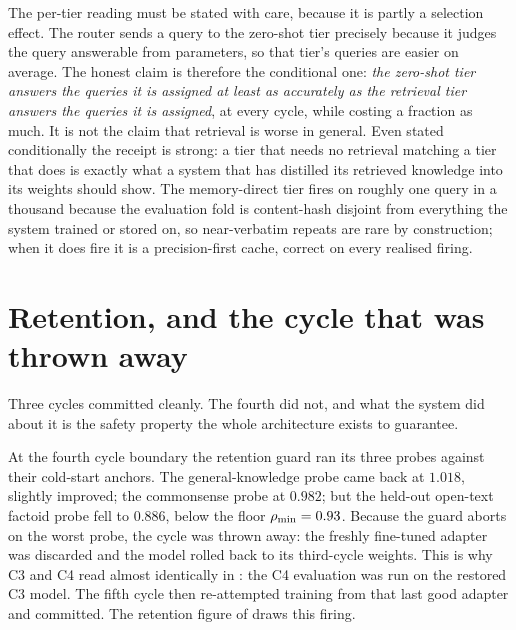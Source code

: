 \begin{bythenumbers}
The per-tier reading must be stated with care, because it is partly a selection effect.
The router sends a query to the zero-shot tier precisely because it judges the query
answerable from parameters, so that tier's queries are easier on average. The honest
claim is therefore the conditional one: \emph{the zero-shot tier answers the queries it
is assigned at least as accurately as the retrieval tier answers the queries it is
assigned}, at every cycle, while costing a fraction as much. It is not the claim that
retrieval is worse in general. Even stated conditionally the receipt is strong: a tier
that needs no retrieval matching a tier that does is exactly what a system that has
distilled its retrieved knowledge into its weights should show. The memory-direct tier
fires on roughly one query in a thousand because the evaluation fold is content-hash
disjoint from everything the system trained or stored on, so near-verbatim repeats are
rare by construction; when it does fire it is a precision-first cache, correct on every
realised firing.
\end{bythenumbers}

\section{Retention, and the cycle that was thrown away}
\label{sec:traj-retention}

Three cycles committed cleanly. The fourth did not, and what the system did about it is
the safety property the whole architecture exists to guarantee.

\begin{precise}
At the fourth cycle boundary the retention guard ran its three probes against their
cold-start anchors. The general-knowledge probe came back at $1.018$, slightly
improved; the commonsense probe at $0.982$; but the held-out open-text factoid probe
fell to $0.886$, below the floor $\rho_{\min} = 0.93$. Because the guard aborts on the
worst probe, the cycle was thrown away: the freshly fine-tuned adapter was discarded
and the model rolled back to its third-cycle weights. This is why C3 and C4 read almost
identically in : the C4 evaluation was run on the restored C3
model. The fifth cycle then re-attempted training from that last good adapter and
committed. The retention figure of  draws this firing.
\end{precise}

